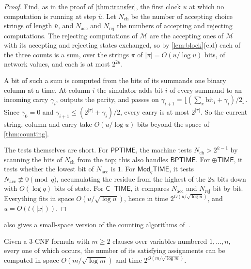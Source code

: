 \documentclass[11pt]{article}
\theoremstyle{definition}
\theoremstyle{definition}
\theoremstyle{remark}
\newcommand{\BPTIME}{\mathsf{BPTIME}}
\newcommand{\PPTIME}{\mathsf{PPTIME}}
\newcommand{\ParTIME}{\oplus\mathsf{TIME}}
\newcommand{\ModTIME}{\mathsf{Mod}_q\mathsf{TIME}}
\newcommand{\CeqTIME}{\mathsf{C}_{=}\mathsf{TIME}}
\newcommand{\acc}{\mathrm{acc}}
\begin{document}
\begin{proof}
Find, as in the proof of \cref{thm:transfer}, the first clock $u$ at which no computation is running at step $\bar u$. Let $N_{\mathrm{ch}}$ be the number of accepting choice strings of length $\bar u$, and $N_{\acc}$ and $N_{\mathrm{rej}}$ the numbers of accepting and rejecting computations. The rejecting computations of $\mathcal M$ are the accepting ones of $\mathcal M$ with its accepting and rejecting states exchanged, so by \cref{lem:block}(c,d) each of the three counts is a sum, over the strings $\pi$ of $|\pi|=O(u/\log u)$ bits, of network values, and each is at most $2^{2u}$.

A bit of such a sum is computed from the bits of its summands one binary column at a time. At column $i$ the simulator adds bit $i$ of every summand to an incoming carry $\gamma_i$, outputs the parity, and passes on $\gamma_{i+1}=\lfloor(\sum_\pi\mathrm{bit}_i+\gamma_i)/2\rfloor$. Since $\gamma_0=0$ and $\gamma_{i+1}\le(2^{|\pi|}+\gamma_i)/2$, every carry is at most $2^{|\pi|}$. So the current string, column and carry take $O(u/\log u)$ bits beyond the space of \cref{thm:counting}.

The tests themselves are short. For $\PPTIME$, the machine tests $N_{\mathrm{ch}}>2^{\bar u-1}$ by scanning the bits of $N_{\mathrm{ch}}$ from the top; this also handles $\BPTIME$. For $\ParTIME$, it tests whether the lowest bit of $N_{\acc}$ is $1$. For $\ModTIME$, it tests $N_{\acc}\not\equiv0\pmod q$, accumulating the residue from the highest of the $2u$ bits down with $O(\log q)$ bits of state. For $\CeqTIME$, it compares $N_{\acc}$ and $N_{\mathrm{rej}}$ bit by bit. Everything fits in space $O(u/\sqrt{\log u})$, hence in time $2^{O(u/\sqrt{\log u})}$, and $u=O(t(|x|))$.
\end{proof}

 also gives a small-space version of the counting algorithms of~\cite{Ope26,Ant26}.

\begin{corollary}\label{cor:3sat}
Given a $3$-CNF formula with $m\ge2$ clauses over variables numbered $1,\dots,n$, every one of which occurs, the number of its satisfying assignments can be computed in space $O(m/\sqrt{\log m})$ and time $2^{O(m/\sqrt{\log m})}$.
\end{corollary}
\end{document}
